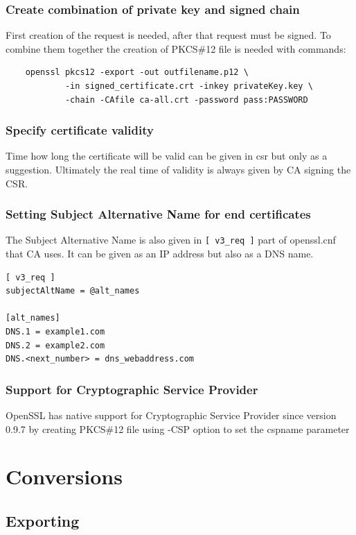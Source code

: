 \documentclass[10pt, a4paper]{report}
\begin{document}
{    \subsubsection{Create combination of private key and signed chain}
    First creation of the request is needed, after that request must be signed. To combine them together the creation of PKCS\#12 file is needed with commands:
\begin{verbatim}
	openssl pkcs12 -export -out outfilename.p12 \
	        -in signed_certificate.crt -inkey privateKey.key \
	        -chain -CAfile ca-all.crt -password pass:PASSWORD
\end{verbatim}
    \subsubsection{Specify certificate validity}
    Time how long the certificate will be valid can be given in csr but only as a suggestion. Ultimately the real time of validity is always given by CA signing the CSR.
    \subsubsection{Setting Subject Alternative Name for end certificates}
    The Subject Alternative Name is also given in \verb+[ v3_req ]+ part of openssl.cnf that CA uses. It can be given as an IP address but also as a DNS name.

\begin{verbatim}
[ v3_req ]
subjectAltName = @alt_names

[alt_names]
DNS.1 = example1.com
DNS.2 = example2.com
DNS.<next_number> = dns_webaddress.com
\end{verbatim}

    \subsubsection{Support for Cryptographic Service Provider}
OpenSSL has native support for Cryptographic Service Provider since version 0.9.7 by creating PKCS\#12 file using -CSP option to set the cspname parameter

    
\section{Conversions}

  \subsection{Exporting}
  
}
\end{document}
